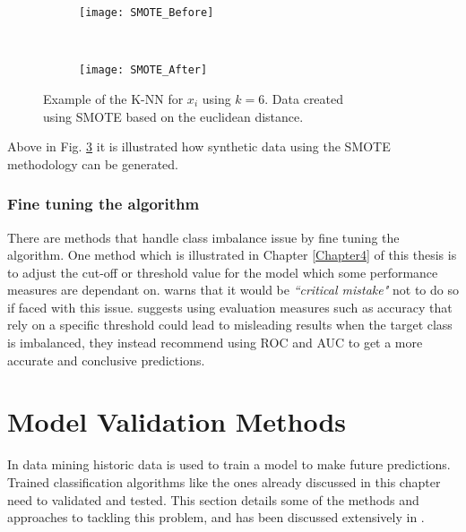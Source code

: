 \begin{figure}[H]
	\centering
	\begin{subfigure}[b]{0.32\textwidth}
		\captionsetup{font=scriptsize}
		\texttt{[image: SMOTE\_Before]}\caption{}
		\label{fig:SMOTE_Before}
	\end{subfigure}  ~\quad
	\begin{subfigure}[b]{0.32\textwidth}
		\captionsetup{font=scriptsize}
		\texttt{[image: SMOTE\_After]}
		\caption{}
		\label{fig:SMOTE_After}
	\end{subfigure}
	\caption{Example of the K-NN for $x_i$ using $k = 6$. Data created \\ using SMOTE based on the euclidean distance.\\
		\cite[Source:][]{he_learning_2009}}
	\label{fig:smoteExample}
\end{figure}

Above in Fig. \ref{fig:smoteExample} it is illustrated how synthetic data using the SMOTE methodology can be generated.


\subsubsection{Fine tuning the algorithm}
There are methods that handle class imbalance issue by fine tuning the algorithm. One method which is illustrated in Chapter \ref{Chapter4} of this thesis is to adjust the cut-off or threshold value for the model which some performance measures are dependant on. \cite{provost_machine_2000} warns that it would be \textit{``critical mistake"} not to do so if faced with this issue. \cite{chawla_editorial:_2004} suggests using evaluation measures such as accuracy that rely on a specific threshold could lead to misleading results when the target class is imbalanced, they instead recommend using ROC and AUC to get a more accurate and conclusive predictions.


\section{Model Validation Methods}\label{sec:modelValid}
In data mining historic data is used to train a model to make future predictions. Trained classification algorithms like the ones already discussed in this chapter need to validated and tested. This section details some of the methods and approaches to tackling this problem, and has been discussed extensively in \citep{refaeilzadeh_cross-validation_2009}.

